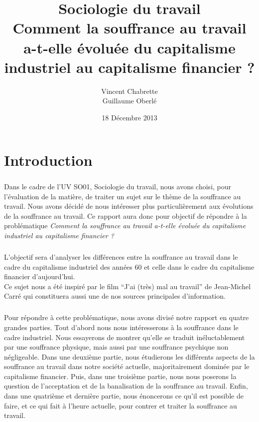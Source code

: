 \documentclass{report}
\title{Sociologie du travail\\Comment la souffrance au travail a-t-elle évoluée du capitalisme industriel au capitalisme financier ?}
\author{Vincent Chabrette\\Guillaume Oberlé}
\date{18 Décembre 2013}
\begin{document}

\maketitle
\tableofcontents

\chapter*{Introduction}
	\paragraph{}
		Dans le cadre de l'UV SO01, Sociologie du travail, nous avons choisi, pour l'évaluation de la matière, de traiter un sujet sur le thème de la souffrance au travail. Nous avons décidé de nous intéresser plus particulièrement aux évolutions de la souffrance au travail. Ce rapport aura donc pour objectif de répondre à la problématique \textit{Comment la souffrance au travail a-t-elle évoluée du capitalisme industriel au capitalisme financier ?}

	\paragraph{}
		L’objectif sera d’analyser les différences entre la souffrance au travail dans le cadre du capitalisme industriel des années 60 et celle dans le cadre du capitalisme financier d’aujourd’hui. \\Ce sujet nous a été inspiré par le film ``J’ai (très) mal au travail'' de Jean-Michel Carré qui constituera aussi une de nos sources principales d’information.

	\paragraph{}
		Pour répondre à cette problématique, nous avons divisé notre rapport en quatre grandes parties. Tout d'abord nous nous intéresserons à la souffrance dans le cadre industriel. Nous essayerons de montrer qu'elle se traduit inéluctablement par une souffrance physique, mais aussi par une souffrance psychique non négligeable. Dans une deuxième partie, nous étudierons les différents aspects de la souffrance au travail dans notre société actuelle, majoritairement dominée par le capitalisme financier. Puis, dans une troisième partie, nous nous poserons la question de l'acceptation et de la banalisation de la souffrance au travail. Enfin, dans une quatrième et dernière partie, nous énoncerons ce qu'il est possible de faire, et ce qui fait à l'heure actuelle, pour contrer et traiter la souffrance au travail.
\end{document}
